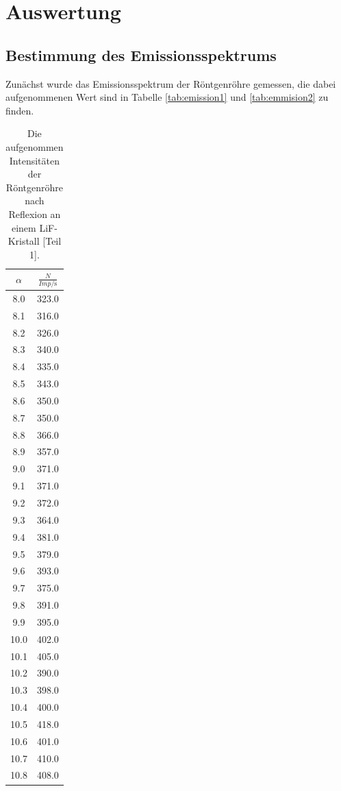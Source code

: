 \section{Auswertung}
\label{sec:Auswertung}
\FloatBarrier
\subsection{Bestimmung des Emissionsspektrums}
Zunächst wurde das Emissionsspektrum der Röntgenröhre gemessen, die dabei aufgenommenen Wert sind in Tabelle \ref{tab:emission1} und \ref{tab:emmision2} zu finden.
\begin{table}
\centering
  \caption{Die aufgenommen Intensitäten der Röntgenröhre nach Reflexion an einem LiF-Kristall [Teil 1].}
  \begin{tabular}[t]{cc}
  \toprule
  $\alpha$ & $\frac{N}{Imp/\si{\second}}$\\
  \midrule
  8.0 & 323.0 \\
  8.1 & 316.0\\
  8.2 & 326.0\\
  8.3 & 340.0\\
  8.4 & 335.0\\
  8.5 & 343.0\\
  8.6 & 350.0\\
  8.7 & 350.0\\
  8.8 & 366.0\\
  8.9 & 357.0\\
  9.0 & 371.0\\
  9.1 & 371.0\\
  9.2 & 372.0\\
  9.3 & 364.0\\
  9.4 & 381.0\\
  9.5 & 379.0\\
  9.6 & 393.0\\
  9.7 & 375.0\\
  9.8 & 391.0\\
  9.9 & 395.0\\
  10.0 & 402.0\\
  10.1 & 405.0\\
  10.2 & 390.0\\
  10.3 & 398.0\\
  10.4 & 400.0\\
  10.5 & 418.0\\
  10.6 & 401.0\\
  10.7 & 410.0\\
  10.8 & 408.0\\
  \bottomrule
  \end{tabular}

\end{table}
